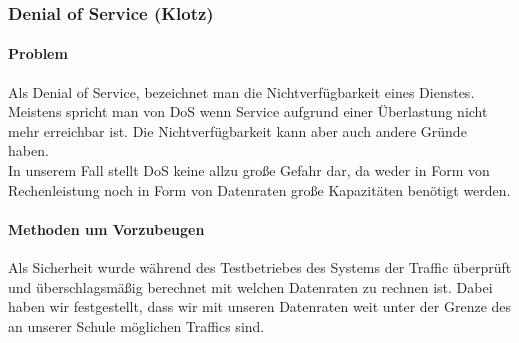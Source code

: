 \subsubsection{Denial of Service (Klotz)}
\paragraph{Problem\\}
Als Denial of Service, bezeichnet man die Nichtverfügbarkeit eines Dienstes. Meistens spricht man von DoS wenn Service aufgrund einer Überlastung nicht mehr erreichbar ist. Die Nichtverfügbarkeit kann aber auch andere Gründe haben.\\
In unserem Fall stellt DoS keine allzu große Gefahr dar, da weder in Form von Rechenleistung noch in Form von Datenraten große Kapazitäten benötigt werden.\\

\paragraph{Methoden um Vorzubeugen\\}
Als Sicherheit wurde während des Testbetriebes des Systems der Traffic überprüft und überschlagsmäßig berechnet mit welchen Datenraten zu rechnen ist. Dabei haben wir festgestellt, dass wir mit unseren Datenraten weit unter der Grenze des an unserer Schule möglichen Traffics sind.\\